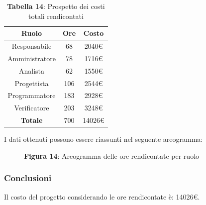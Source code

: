 \begin{table}[H]
	\centering
	\renewcommand{\arraystretch}{1.5}
	\begin{tabular}{|c|c|c|}
		\hline
		\rowcolor{lighter-grayer}
Ruolo & Ore & Costo \\ \hline
Responsabile & 68 & 2040\euro \\ \hline
Amministratore & 78 & 1716\euro \\ \hline
Analista & 62 & 1550\euro \\ \hline
Progettista & 106 & 2544\euro \\ \hline
Programmatore & 183 & 2928\euro \\ \hline
Verificatore & 203 & 3248\euro \\ \hline
\textbf{Totale} & 700 & 14026\euro \\ \hline
	\end{tabular}
	\caption*{\textbf{Tabella 14}: Prospetto dei costi totali rendicontati \\}
\end{table}

I dati ottenuti possono essere riassunti nel seguente areogramma:


\begin{figure}[H]
	\centering
	\caption*{\textbf{Figura 14}: Areogramma delle ore rendicontate per ruolo}
    \label{fig:Figura10}
\end{figure}

\subsubsection{Conclusioni}
Il costo del progetto considerando le ore rendicontate è: 14026\euro.